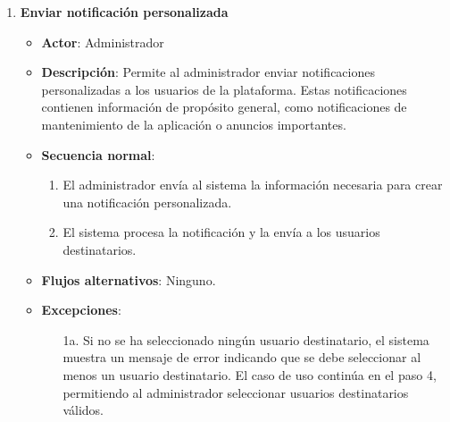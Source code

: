 \begin{enumerate}[label=UC-\protect\twodigits{\arabic*}:, align=left, leftmargin=*]
\item \textbf{Enviar notificación personalizada}
\begin{itemize}
\item \textbf{Actor}: Administrador
\item \textbf{Descripción}: Permite al administrador enviar notificaciones personalizadas a los usuarios de la plataforma. Estas notificaciones contienen información de propósito general, como notificaciones de mantenimiento de la aplicación o anuncios importantes.
\item \textbf{Secuencia normal}:
\begin{enumerate}[label={\arabic*}:]
\item El administrador envía al sistema la información necesaria para crear una notificación personalizada.
\item El sistema procesa la notificación y la envía a los usuarios destinatarios.
\end{enumerate}
\item \textbf{Flujos alternativos}: Ninguno.
\item \textbf{Excepciones}:
\begin{itemize}
\item[1a.] Si no se ha seleccionado ningún usuario destinatario, el sistema muestra un mensaje de error indicando que se debe seleccionar al menos un usuario destinatario. El caso de uso continúa en el paso 4, permitiendo al administrador seleccionar usuarios destinatarios válidos.
\end{itemize}
\end{itemize}


\end{enumerate}
